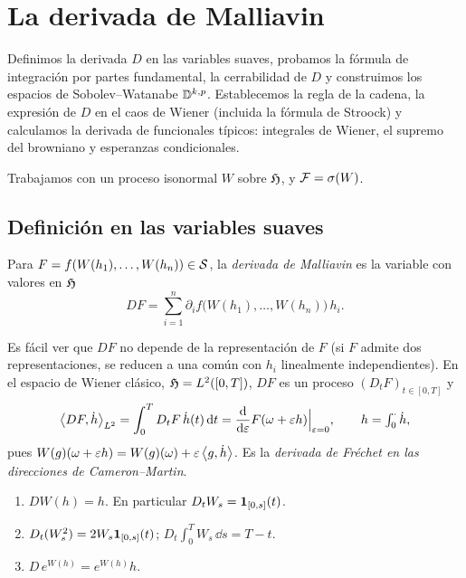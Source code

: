 \chapter{La derivada de Malliavin}\label{cap:derivada}

\begin{panorama}
Definimos la derivada $D$ en las variables suaves, probamos la fórmula de integración por
partes fundamental, la cerrabilidad de $D$ y construimos los espacios de Sobolev--Watanabe
$\mathbb{D}^{k,p}$. Establecemos la regla de la cadena, la expresión de $D$ en el caos de Wiener (incluida
la fórmula de Stroock) y calculamos la derivada de funcionales típicos: integrales de
Wiener, el supremo del browniano y esperanzas condicionales.
\end{panorama}

Trabajamos con un proceso isonormal $W$ sobre $\mathfrak{H}$, y $\mathcal{F}=\sigma(W)$.

\section{Definición en las variables suaves}

\begin{definicion}
Para $F=f(W(h_1),\dots,W(h_n))\in\mathcal{S}$, la \emph{derivada de Malliavin} es la variable
con valores en $\mathfrak{H}$
\[
  DF=\sum_{i=1}^n\partial_if\big(W(h_1),\dots,W(h_n)\big)\,h_i.
\]
\end{definicion}

Es fácil ver que $DF$ no depende de la representación de $F$ (si $F$ admite dos representaciones,
se reducen a una común con $h_i$ linealmente independientes). En el espacio de Wiener clásico,
$\mathfrak{H}=L^2([0,T])$, $DF$ es un proceso $(D_tF)_{t\in[0,T]}$ y
\[
  \left\langle DF, \dot h\right\rangle_{L^2}=\int_0^TD_tF\,\dot h(t)\,\mathrm{d} t=\frac{\mathrm{d}}{\mathrm{d}\varepsilon}F(\omega+\varepsilon h)\Big|_{\varepsilon=0},\qquad h=\textstyle\int_0^\cdot\dot h,
\]
pues $W(g)(\omega+\varepsilon h)=W(g)(\omega)+\varepsilon\left\langle g, \dot h\right\rangle$. Es la \emph{derivada de Fréchet en las direcciones de
Cameron--Martin}.

\begin{ejemplo}
\begin{enumerate}[label=(\alph*)]
  \item $DW(h)=h$. En particular $D_tW_s=\mathbf{1}_{[0,s]}(t)$.
  \item $D_t(W_s^2)=2W_s\mathbf{1}_{[0,s]}(t)$; $D_t\int_0^TW_s\,\dd s=T-t$.
  \item $D\,e^{W(h)}=e^{W(h)}h$.
\end{enumerate}
\end{ejemplo}

